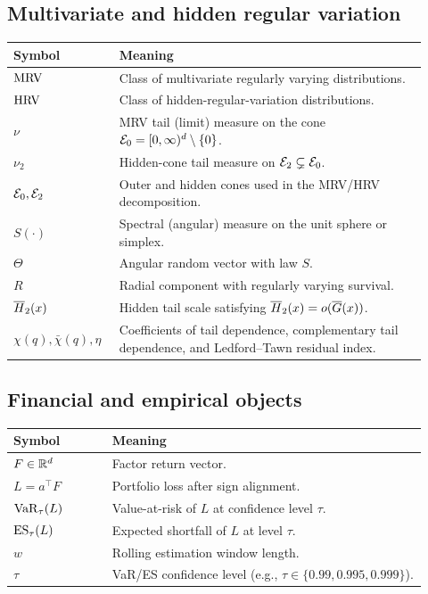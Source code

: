 \subsection{Multivariate and hidden regular variation}

\begin{longtable}{p{0.22\linewidth}p{0.70\linewidth}}
\toprule
Symbol & Meaning \\
\midrule
\endhead
\(\mathrm{MRV}\) & Class of multivariate regularly varying distributions. \\
\(\mathrm{HRV}\) & Class of hidden-regular-variation distributions. \\
\(\nu\) & MRV tail (limit) measure on the cone \(\mathcal{E}_0=[0,\infty)^d\setminus\{0\}\). \\
\(\nu_2\) & Hidden-cone tail measure on \(\mathcal{E}_2\subsetneq\mathcal{E}_0\). \\
\(\mathcal{E}_0,\mathcal{E}_2\) & Outer and hidden cones used in the MRV/HRV decomposition. \\
\(S(\cdot)\) & Spectral (angular) measure on the unit sphere or simplex. \\
\(\Theta\) & Angular random vector with law \(S\). \\
\(R\) & Radial component with regularly varying survival. \\
\(\overline{H}_2(x)\) & Hidden tail scale satisfying \(\overline{H}_2(x)=o(\overline{G}(x))\). \\
\(\chi(q),\bar\chi(q),\eta\) & Coefficients of tail dependence, complementary tail dependence, and Ledford--Tawn residual index. \\
\bottomrule
\end{longtable}

\subsection{Financial and empirical objects}

\begin{longtable}{p{0.22\linewidth}p{0.70\linewidth}}
\toprule
Symbol & Meaning \\
\midrule
\endhead
\(F\in\mathbb{R}^d\) & Factor return vector. \\
\(L=a^\top F\) & Portfolio loss after sign alignment. \\
\(\mathrm{VaR}_\tau(L)\) & Value-at-risk of \(L\) at confidence level \(\tau\). \\
\(\mathrm{ES}_\tau(L)\) & Expected shortfall of \(L\) at level \(\tau\). \\
\(w\) & Rolling estimation window length. \\
\(\tau\) & VaR/ES confidence level (e.g., \(\tau\in\{0.99,0.995,0.999\}\)). \\
\bottomrule
\end{longtable}


